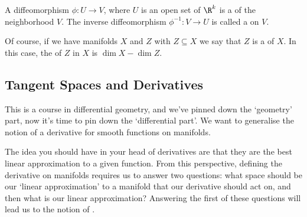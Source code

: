 \begin{definition}[Chart]
    A diffeomorphism $\phi: U \rightarrow V$, where $U$ is an open set of $\R^k$ is a  of the neighborhood $V$. The inverse diffeomorphism $\phi^{-1}: V \rightarrow U$ is called a  on $V$.
\end{definition}

Of course, if we have manifolds $X$ and $Z$ with $Z \subseteq X$ we say that $Z$ is a  of $X$. In this case, the  of $Z$ in $X$ is $\dim X - \dim Z$.

\subsection{Tangent Spaces and Derivatives}

This is a course in differential geometry, and we've pinned down the `geometry' part, now it's time to pin down the `differential part'. We want to generalise the notion of a derivative for smooth functions on manifolds. 

The idea you should have in your head of derivatives are that they are the best linear approximation to a given function. From this perspective, defining the derivative on manifolds requires us to answer two questions: 
what space should be our `linear approximation' to a manifold that our derivative should act on, and then what is our linear approximation? Answering the first of these questions will lead us to the notion of .

